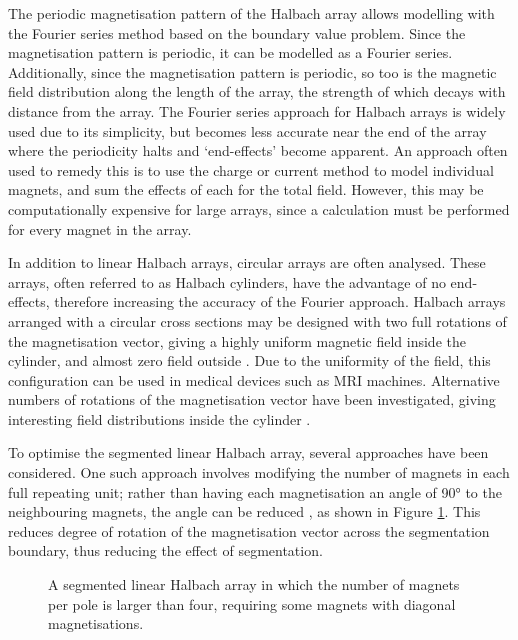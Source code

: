 The periodic magnetisation pattern of the Halbach array allows modelling with the Fourier series method based on the boundary value problem. Since the magnetisation pattern is periodic, it can be modelled as a Fourier series. Additionally, since the magnetisation pattern is periodic, so too is the magnetic field distribution along the length of the array, the strength of which decays with distance from the array. The Fourier series approach for Halbach arrays is widely used due to its simplicity, but becomes less accurate near the end of the array where the periodicity halts and `end-effects' become apparent. An approach often used to remedy this is to use the charge or current method to model individual magnets, and sum the effects of each for the total field. However, this may be computationally expensive for large arrays, since a calculation must be performed for every magnet in the array.

In addition to linear Halbach arrays, circular arrays are often analysed. These arrays, often referred to as Halbach cylinders, have the advantage of no end-effects, therefore increasing the accuracy of the Fourier approach. Halbach arrays arranged with a circular cross sections may be designed with two full rotations of the magnetisation vector, giving a highly uniform magnetic field inside the cylinder, and almost zero field outside \cite{Halbach1985}. Due to the uniformity of the field, this configuration can be used in medical devices such as MRI machines. Alternative numbers of rotations of the magnetisation vector have been investigated, giving interesting field distributions inside the cylinder \cite{Blumler2016,Sonawane2016,Raich2004,Halbach1979}.

To optimise the segmented linear Halbach array, several approaches have been considered. One such approach involves modifying the number of magnets in each full repeating unit; rather than having each magnetisation an angle of \ang{90} to the neighbouring magnets, the angle can be reduced \cite{Shen2013,Hoburg2004,Wang2010}, as shown in Figure \ref{fig:halbachAngle}. This reduces degree of rotation of the magnetisation vector across the segmentation boundary, thus reducing the effect of segmentation.
\begin{figure}
    \centering
    
    \caption{A segmented linear Halbach array in which the number of magnets per pole is larger than four, requiring some magnets with diagonal magnetisations.}
    \label{fig:halbachAngle}
\end{figure}

